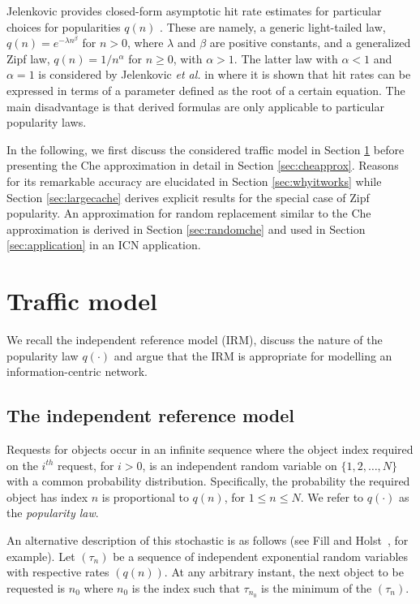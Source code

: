 \documentclass{amsart}
\def\etal{{\em et al. }}
\begin{document}
Jelenkovic provides closed-form asymptotic hit rate estimates for particular choices for popularities $q(n)$  \cite{Jelenkovic99}. These are namely, a generic light-tailed law, $q(n)=e^{-\lambda n^{\beta}}$ for $n>0$, where $\lambda$ and $\beta$ are positive constants, and a generalized Zipf law, $q(n)=1/n^{\alpha}$ for $n\ge 0$, with $\alpha>1$. The latter law with $\alpha < 1$ and $\alpha =1$ is considered by Jelenkovic \etal in \cite{JKR05} where it is shown that hit rates can be expressed in terms of a parameter defined as the root of a certain equation.  The main disadvantage is that derived formulas are only applicable to particular popularity laws.

\vspace{2mm}
In the following, we first discuss the considered traffic model in Section \ref{sec:trafficmodel}  before presenting the Che approximation in detail in Section \ref{sec:cheapprox}. Reasons for its remarkable accuracy are elucidated in Section \ref{sec:whyitworks} while Section \ref{sec:largecache} derives explicit results for the special case of Zipf popularity. An approximation for random replacement similar to the Che approximation is derived in Section \ref{sec:randomche} and used in Section \ref{sec:application} in an ICN application.





 
 \section{Traffic model}
 \label{sec:trafficmodel}
 
We recall the independent reference model (IRM), discuss the nature of the popularity law $q(\cdot)$ and argue that the IRM is appropriate for modelling an information-centric network.

\subsection{The independent reference model}
 
Requests for objects occur in an infinite sequence where the object index required on the $i^{th}$ request,  for $i>0$, is an independent random variable on $\{1,2,\ldots,N\}$ with a common probability distribution. Specifically, the probability the required object has index $n$ is proportional to $q(n)$, for $1\le n \le N$. We refer to $q(\cdot)$ as the \emph{popularity law}. 

An alternative description of this stochastic is as follows (see Fill and Holst~\cite{FillHolst}, for example). Let $(\tau_n)$ be a sequence of independent exponential random variables with respective rates $(q(n))$. At any arbitrary instant, the next object to be requested is $n_0$ where $n_0$ is the index such that $\tau_{n_0}$ is the minimum of the $(\tau_n)$. 
\end{document}
